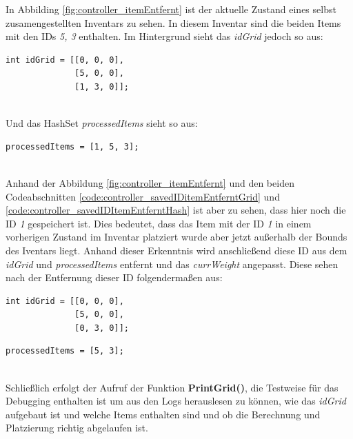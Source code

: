 In Abbilding \ref{fig:controller_itemEntfernt} ist der aktuelle Zustand eines selbst zusamengestellten Inventars zu sehen. In
diesem Inventar sind die beiden Items mit den IDs \textit{5, 3} enthalten. Im Hintergrund sieht das \textit{idGrid} jedoch so aus:
\begin{lstlisting}[style=csharp, caption={ID trotz nicht vorhandenem Item gespeichert}, label=code:controller_savedIDitemEntferntGrid]
int idGrid = [[0, 0, 0],
              [5, 0, 0],
              [1, 3, 0]];
\end{lstlisting}\\
Und das HashSet \textit{processedItems} sieht so aus:
\begin{lstlisting}[style=csharp, caption={ID trotz nicht vorhandenem Item gespeichert}, label=code:controller_savedIDItemEntferntHash]
processedItems = [1, 5, 3];
\end{lstlisting}\\
Anhand der Abbildung \ref{fig:controller_itemEntfernt} und den beiden Codeabschnitten \ref{code:controller_savedIDitemEntferntGrid}
und \ref{code:controller_savedIDItemEntferntHash} ist aber zu sehen, dass hier noch die ID \textit{1} gespeichert ist.
Dies bedeutet, dass das Item mit der ID \textit{1} in einem vorherigen Zustand im Inventar platziert wurde aber jetzt außerhalb
der Bounds des Iventars liegt. Anhand dieser Erkenntnis wird anschließend diese ID aus dem \textit{idGrid} und \textit{processedItems}
entfernt und das \textit{currWeight} angepasst. Diese sehen nach der Entfernung dieser ID folgendermaßen aus:
\begin{lstlisting}[style=csharp, caption={ID trotz nicht vorhandenem Item gespeichert}, label=code:controller_savedIDgg]
int idGrid = [[0, 0, 0],
              [5, 0, 0],
              [0, 3, 0]];
\end{lstlisting}
\begin{lstlisting}[style=csharp, caption={ID verspeichert}, label=code:controller_savedIDID]
processedItems = [5, 3];
\end{lstlisting}\\
Schließlich erfolgt der Aufruf der Funktion \textbf{PrintGrid()}, die Testweise für das Debugging enthalten ist
um aus den Logs herauslesen zu können, wie das \textit{idGrid} aufgebaut ist und welche Items enthalten sind und ob
die Berechnung und Platzierung richtig abgelaufen ist.

